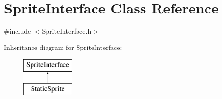 \hypertarget{class_sprite_interface}{}\section{Sprite\+Interface Class Reference}
\label{class_sprite_interface}


{\ttfamily \#include $<$Sprite\+Interface.\+h$>$}

Inheritance diagram for Sprite\+Interface\+:\begin{figure}[H]
\begin{center}
\leavevmode
\includegraphics[height=2.000000cm]{class_sprite_interface}
\end{center}
\end{figure}
